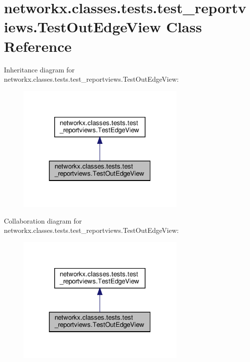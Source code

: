 \hypertarget{classnetworkx_1_1classes_1_1tests_1_1test__reportviews_1_1TestOutEdgeView}{}\section{networkx.\+classes.\+tests.\+test\+\_\+reportviews.\+Test\+Out\+Edge\+View Class Reference}
\label{classnetworkx_1_1classes_1_1tests_1_1test__reportviews_1_1TestOutEdgeView}


Inheritance diagram for networkx.\+classes.\+tests.\+test\+\_\+reportviews.\+Test\+Out\+Edge\+View\+:
\nopagebreak
\begin{figure}[H]
\begin{center}
\leavevmode
\includegraphics[width=235pt]{classnetworkx_1_1classes_1_1tests_1_1test__reportviews_1_1TestOutEdgeView__inherit__graph}
\end{center}
\end{figure}


Collaboration diagram for networkx.\+classes.\+tests.\+test\+\_\+reportviews.\+Test\+Out\+Edge\+View\+:
\nopagebreak
\begin{figure}[H]
\begin{center}
\leavevmode
\includegraphics[width=235pt]{classnetworkx_1_1classes_1_1tests_1_1test__reportviews_1_1TestOutEdgeView__coll__graph}
\end{center}
\end{figure}
